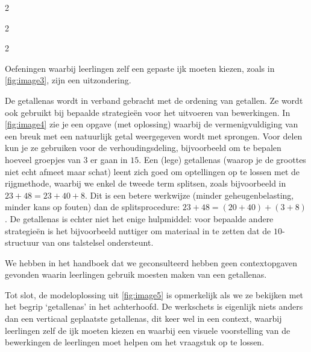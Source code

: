 \begin{multicols}{2}


\end{multicols}
\begin{multicols}{2}


\end{multicols}

\newpage

\begin{multicols}{2}

Oefeningen waarbij leerlingen zelf een gepaste ijk moeten kiezen, zoals in \autoref{fig:image3}, zijn een uitzondering. 

De getallenas wordt in verband gebracht met de ordening van getallen.
Ze wordt ook gebruikt bij bepaalde strategieën voor het uitvoeren van bewerkingen.
In \autoref{fig:image4} zie je een opgave (met oplossing) waarbij de vermenigvuldiging van een breuk met een natuurlijk getal weergegeven wordt met sprongen.
Voor delen kun je ze gebruiken voor de verhoudingsdeling, bijvoorbeeld om te bepalen hoeveel groepjes van \(3\) er gaan in \(15\).
Een (lege) getallenas (waarop je de groottes niet echt afmeet maar schat) leent zich goed om optellingen op te lossen met de rijgmethode, waarbij we enkel de tweede term splitsen, zoals bijvoorbeeld in \(23 + 48 = 23 + 40 + 8\).
Dit is een betere werkwijze (minder geheugenbelasting, minder kans op fouten) dan de splitsprocedure: \(23 + 48 = (20 + 40) + (3 + 8)\).
De getallenas is echter niet het enige hulpmiddel: voor bepaalde andere strategieën is het bijvoorbeeld nuttiger om materiaal in te zetten dat de \(10\)-structuur van ons talstelsel ondersteunt.

We hebben in het handboek dat we geconsulteerd hebben geen contextopgaven gevonden waarin leerlingen gebruik moesten maken van een getallenas.

Tot slot, de modeloplossing uit \autoref{fig:image5} is opmerkelijk als we ze bekijken met het begrip `getallenas' in het achterhoofd.
De werkschets is eigenlijk niets anders dan een verticaal geplaatste getallenas, dit keer wel in een context, waarbij leerlingen zelf de ijk moeten kiezen en waarbij een visuele voorstelling van de bewerkingen de leerlingen moet helpen om het vraagstuk op te lossen.



\end{multicols}
